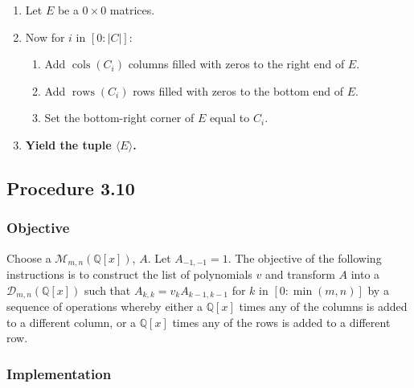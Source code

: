 \documentclass[twocolumn]{article}
\DeclareMathOperator{\cols}{cols}
\DeclareMathOperator{\rows}{rows}
\newcommand{\procedure}[2][]{\subsection*{Procedure #2 \ifthenelse{\equal{#1}{}}{}{(#1)}}\label{sec:procedure #2}}
\newcommand{\objective}{\subsubsection*{Objective}}
\newcommand{\implementation}{\subsubsection*{Implementation}}
\begin{document}
			\begin{enumerate}
				\item Let $E$ be a $0\times 0$ matrices.
				\item Now for $i$ in $[0:\lvert C\rvert]$:
				\begin{enumerate}
					\item Add $\cols(C_i)$ columns filled with zeros to the right end of $E$.
					\item Add $\rows(C_i)$ rows filled with zeros to the bottom end of $E$.
					\item Set the bottom-right corner of $E$ equal to $C_i$.
				\end{enumerate}
				\item \textbf{Yield the tuple $\langle E\rangle$.}
			\end{enumerate}
		\procedure{3.10}
			\objective
				Choose a $\mathcal{M}_{m,n}(\mathbb{Q}[x])$, $A$. Let $A_{-1,-1}=1$. The objective of the following instructions is to construct the list of polynomials $v$ and transform $A$ into a $\mathcal{D}_{m,n}(\mathbb{Q}[x])$ such that $A_{k,k}=v_kA_{k-1,k-1}$ for $k$ in $[0:\min(m,n)]$ by a sequence of operations whereby either a $\mathbb{Q}[x]$ times any of the columns is added to a different column, or a $\mathbb{Q}[x]$ times any of the rows is added to a different row.
			\implementation
\end{document}
